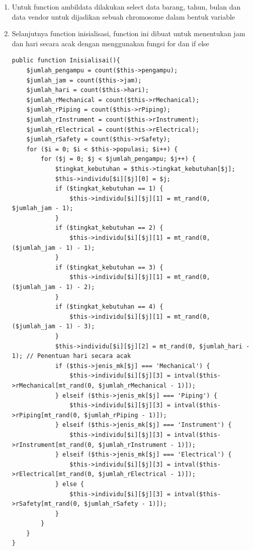 \begin{enumerate}
\begin{enumerate}
	\item Untuk function ambildata dilakukan select data barang, tahun, bulan dan data vendor untuk dijadikan sebuah chromosome dalam bentuk variable
	
	\item Selanjutnya function inisialisasi, function ini dibuat untuk menentukan jam dan hari secara acak dengan menggunakan fungsi for dan if else
\begin{lstlisting}
public function Inisialisai(){
    $jumlah_pengampu = count($this->pengampu);        
    $jumlah_jam = count($this->jam);
    $jumlah_hari = count($this->hari);
    $jumlah_rMechanical = count($this->rMechanical);
    $jumlah_rPiping = count($this->rPiping);
    $jumlah_rInstrument = count($this->rInstrument);
    $jumlah_rElectrical = count($this->rElectrical);
    $jumlah_rSafety = count($this->rSafety);
    for ($i = 0; $i < $this->populasi; $i++) {
        for ($j = 0; $j < $jumlah_pengampu; $j++) {
            $tingkat_kebutuhan = $this->tingkat_kebutuhan[$j];
            $this->individu[$i][$j][0] = $j;
            if ($tingkat_kebutuhan == 1) {
                $this->individu[$i][$j][1] = mt_rand(0,  $jumlah_jam - 1);
            }
            if ($tingkat_kebutuhan == 2) {
                $this->individu[$i][$j][1] = mt_rand(0, ($jumlah_jam - 1) - 1);
            }
            if ($tingkat_kebutuhan == 3) {
                $this->individu[$i][$j][1] = mt_rand(0, ($jumlah_jam - 1) - 2);
            }
            if ($tingkat_kebutuhan == 4) {
                $this->individu[$i][$j][1] = mt_rand(0, ($jumlah_jam - 1) - 3);
            }
            $this->individu[$i][$j][2] = mt_rand(0, $jumlah_hari - 1); // Penentuan hari secara acak 
            if ($this->jenis_mk[$j] === 'Mechanical') {
                $this->individu[$i][$j][3] = intval($this->rMechanical[mt_rand(0, $jumlah_rMechanical - 1)]);
            } elseif ($this->jenis_mk[$j] === 'Piping') {
                $this->individu[$i][$j][3] = intval($this->rPiping[mt_rand(0, $jumlah_rPiping - 1)]);
            } elseif ($this->jenis_mk[$j] === 'Instrument') {
                $this->individu[$i][$j][3] = intval($this->rInstrument[mt_rand(0, $jumlah_rInstrument - 1)]);
            } elseif ($this->jenis_mk[$j] === 'Electrical') {
                $this->individu[$i][$j][3] = intval($this->rElectrical[mt_rand(0, $jumlah_rElectrical - 1)]);
            } else {
                $this->individu[$i][$j][3] = intval($this->rSafety[mt_rand(0, $jumlah_rSafety - 1)]);                    
            }
        }
    }
}
\end{lstlisting}
	

\end{enumerate}
\end{enumerate}
